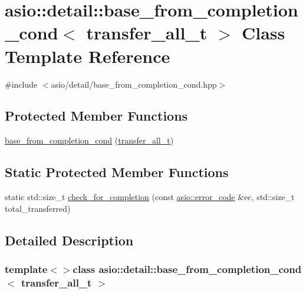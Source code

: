 \hypertarget{classasio_1_1detail_1_1base__from__completion__cond_3_01transfer__all__t_01_4}{}\section{asio\+:\+:detail\+:\+:base\+\_\+from\+\_\+completion\+\_\+cond$<$ transfer\+\_\+all\+\_\+t $>$ Class Template Reference}
\label{classasio_1_1detail_1_1base__from__completion__cond_3_01transfer__all__t_01_4}


{\ttfamily \#include $<$asio/detail/base\+\_\+from\+\_\+completion\+\_\+cond.\+hpp$>$}

\subsection*{Protected Member Functions}
\begin{DoxyCompactItemize}
\item 
\hyperlink{classasio_1_1detail_1_1base__from__completion__cond_3_01transfer__all__t_01_4_af33c4c5ca9fe207c626a2f84640fdc42}{base\+\_\+from\+\_\+completion\+\_\+cond} (\hyperlink{classasio_1_1detail_1_1transfer__all__t}{transfer\+\_\+all\+\_\+t})
\end{DoxyCompactItemize}
\subsection*{Static Protected Member Functions}
\begin{DoxyCompactItemize}
\item 
static std\+::size\+\_\+t \hyperlink{classasio_1_1detail_1_1base__from__completion__cond_3_01transfer__all__t_01_4_a8c3306c674c2ff746123ed3c0fe3d93c}{check\+\_\+for\+\_\+completion} (const \hyperlink{classasio_1_1error__code}{asio\+::error\+\_\+code} \&ec, std\+::size\+\_\+t total\+\_\+transferred)
\end{DoxyCompactItemize}


\subsection{Detailed Description}
\subsubsection*{template$<$$>$class asio\+::detail\+::base\+\_\+from\+\_\+completion\+\_\+cond$<$ transfer\+\_\+all\+\_\+t $>$}



